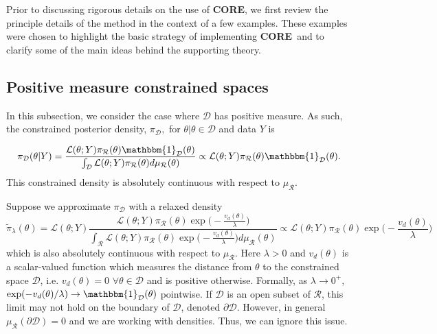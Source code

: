 \documentclass[10pt,fleqn]{article}
\newcommand{\leo}[1]{{\color{blue}{Leo: #1}}}
\newcommand{\core}{\textbf{CORE}}
\DeclareMathOperator{\1}{\mathbbm{1}}
\begin{document}
{Prior to discussing rigorous details on the use of \core, we first review the  principle details of the method in the context of a few examples.  These examples were chosen to highlight the basic strategy of implementing \core\, and to clarify some of the main ideas behind the supporting theory.


%

\subsection{Positive measure constrained spaces}
\label{SEC:Positive_measure_methods}
In this subsection, we consider the case where $\mathcal{D}$ has positive measure.  As such, the constrained posterior density, $\pi_\mathcal{D},$ for $\theta|\theta \in \mathcal{D}$ and data $Y$ is 

$$\pi_\mathcal{D}(\theta|Y) = \frac{\mathcal{L}(\theta; Y) \pi_\mathcal{R}(\theta)\mathbbm{1}_\mathcal{D}(\theta)}{\int_\mathcal{D} \mathcal{L}(\theta; Y) \pi_\mathcal{R}(\theta)d\mu_\mathcal{R}(\theta)}\propto \mathcal{L}(\theta; Y) \pi_\mathcal{R}(\theta)\mathbbm{1}_\mathcal{D}(\theta). $$
This constrained density is absolutely continuous with respect to $\mu_\mathcal{R}$.  

Suppose we approximate $\pi_\mathcal{D}$ with a relaxed density $$\tilde{\pi}_\lambda(\theta) = \mathcal{L}(\theta; Y) \frac{\mathcal{L}(\theta; Y)\pi_\mathcal{R}(\theta)\exp\big(-\frac{v_d(\theta)}{\lambda}\big)}{\int_{\mathcal{R}}\mathcal{L}(\theta; Y) \pi_\mathcal{R}(\theta)\exp\big(-\frac{v_d(\theta)}{\lambda}\big) d\mu_\mathcal{R}(\theta)} \propto \mathcal{L}(\theta; Y) \pi_\mathcal{R}(\theta)\exp\big(-\frac{v_d(\theta)}{\lambda}\big)$$
which is also absolutely continuous with respect to $\mu_\mathcal{R}.$
Here $\lambda >0$ and $v_d(\theta)$ is a scalar-valued function which measures the distance from $\theta$ to the constrained space $\mathcal{D}$, i.e. $v_d(\theta) = 0 $ $\forall \theta \in \mathcal{D}$ and is positive otherwise.  Formally, as $\lambda \to 0^+$, $\exp(-v_d(\theta)/\lambda) \to \mathbbm{1}_\mathcal{D}(\theta)$ pointwise.  If $\mathcal{D}$ is an open subset of $\mathcal{R}$, this limit may not hold on the boundary of $\mathcal{D}$, denoted $\partial \mathcal{D}$.  However, in general $\mu_\mathcal{R}(\partial \mathcal{D}) = 0$ and we are working with densities. Thus, we can ignore this issue.

}
\end{document}
